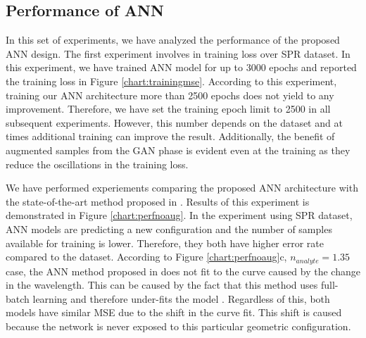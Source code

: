 \documentclass[10pt]{IEEEtran}
\begin{document}
\subsection{Performance of ANN}

In this set of experiments, we have analyzed the performance of the proposed ANN design. The first experiment involves in training loss over SPR dataset. In this experiment, we have trained ANN model for up to 3000 epochs and reported the training loss in Figure \ref{chart:trainingmse}. According to this experiment, training our ANN architecture more than 2500 epochs does not yield to any improvement. Therefore, we have set the training epoch limit to 2500 in all subsequent experiments. However, this number depends on the dataset and at times additional training can improve the result. Additionally, the benefit of augmented samples from the GAN phase is evident even at the training as they reduce the oscillations in the training loss.

We have performed experiements comparing the proposed ANN architecture with the state-of-the-art method proposed in \cite{paper0}. Results of this experiment is demonstrated in Figure \ref{chart:perfnoaug}. In the experiment using SPR dataset, ANN models are predicting a new configuration and the number of samples available for training is lower. Therefore, they both have higher error rate compared to the \dszero{} dataset. According to Figure \ref{chart:perfnoaug}c, $n_{analyte} = 1.35$ case, the ANN method proposed in \cite{paper0} does not fit to the curve caused by the change in the wavelength. This can be caused by the fact that this method uses full-batch learning and therefore under-fits the model \cite{keskar2016large}. Regardless of this, both models have similar MSE due to the shift in the curve fit. This shift is caused because the network is never exposed to this particular geometric configuration. 
\end{document}
